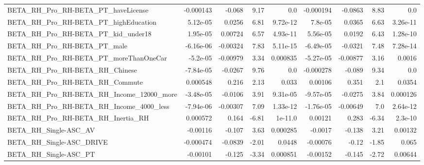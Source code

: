 \begin{tabular}{lrrrrrrrr}
BETA\_RH\_Pro\_RH-BETA\_PT\_haveLicense                 &   -0.000143 &       -0.068 &     9.17 &      0.0 &  -0.000194 &     -0.0863 &         8.83 &           0.0 \\
BETA\_RH\_Pro\_RH-BETA\_PT\_highEducation               &    5.12e-05 &       0.0256 &     6.81 & 9.72e-12 &    7.8e-05 &      0.0365 &         6.63 &      3.26e-11 \\
BETA\_RH\_Pro\_RH-BETA\_PT\_kid\_under18                 &    1.95e-05 &      0.00724 &     6.57 & 4.93e-11 &   5.56e-05 &      0.0192 &         6.43 &      1.28e-10 \\
BETA\_RH\_Pro\_RH-BETA\_PT\_male                        &   -6.16e-06 &     -0.00324 &     7.83 & 5.11e-15 &  -6.49e-05 &     -0.0321 &         7.48 &      7.28e-14 \\
BETA\_RH\_Pro\_RH-BETA\_PT\_moreThanOneCar              &    -5.2e-05 &     -0.00979 &     3.34 & 0.000835 &  -5.27e-05 &    -0.00877 &         3.16 &        0.0016 \\
BETA\_RH\_Pro\_RH-BETA\_RH\_Chinese                     &   -7.84e-05 &      -0.0267 &     9.76 &      0.0 &  -0.000278 &      -0.089 &         9.34 &           0.0 \\
BETA\_RH\_Pro\_RH-BETA\_RH\_Commute                     &    0.000548 &        0.216 &     2.13 &    0.033 &    0.00106 &       0.351 &          2.1 &        0.0354 \\
BETA\_RH\_Pro\_RH-BETA\_RH\_Income\_12000\_more           &   -3.48e-05 &      -0.0106 &     3.91 & 9.31e-05 &  -9.57e-05 &     -0.0275 &         3.84 &      0.000126 \\
BETA\_RH\_Pro\_RH-BETA\_RH\_Income\_4000\_less            &   -7.94e-06 &     -0.00307 &     7.09 & 1.33e-12 &  -1.76e-05 &    -0.00649 &          7.0 &      2.64e-12 \\
BETA\_RH\_Pro\_RH-BETA\_RH\_Inertia\_RH                  &    0.000572 &        0.164 &    -6.81 &  1e-11.0 &    0.00121 &       0.283 &        -6.34 &       2.3e-10 \\
BETA\_RH\_Single-ASC\_AV                              &    -0.00116 &       -0.107 &     3.63 & 0.000285 &    -0.0017 &      -0.138 &         3.21 &       0.00132 \\
BETA\_RH\_Single-ASC\_DRIVE                           &   -0.000474 &      -0.0839 &    -2.01 &   0.0448 &   -0.00076 &       -0.12 &        -1.85 &         0.065 \\
BETA\_RH\_Single-ASC\_PT                              &    -0.00101 &       -0.125 &    -3.34 & 0.000851 &   -0.00152 &      -0.145 &        -2.72 &       0.00644 \\

\end{tabular}
